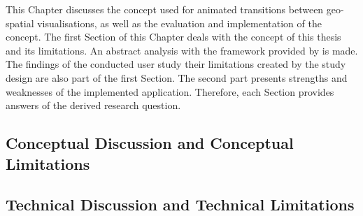 \cbstart
This Chapter discusses the concept used for animated transitions between geo-spatial visualisations, as well as the evaluation and implementation of the concept.
The first Section of this Chapter deals with the concept of this thesis and its limitations. An abstract analysis with the framework provided by \citeauthor{Munzner2014} is made. The findings of the conducted user study their limitations created by the study design are also part of the first Section. The second part presents strengths and weaknesses of the implemented application. Therefore, each Section provides answers of the derived research question.
\cbend

\subsection{Conceptual Discussion and Conceptual Limitations}


\newpage
\subsection{Technical Discussion and Technical Limitations}

